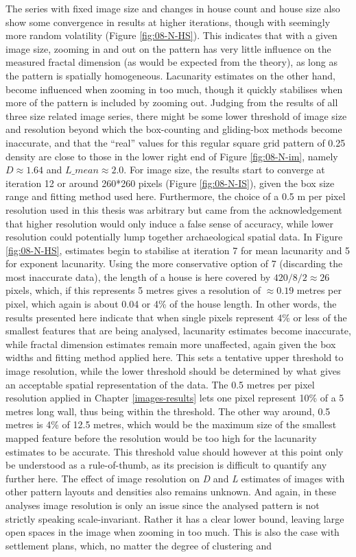 \documentclass[
  12pt,
]{book}
\begin{document}
The series with fixed image size and changes in house count and house size also show some convergence in results at higher iterations, though with seemingly more random volatility (Figure \ref{fig:08-N-HS}). This indicates that with a given image size, zooming in and out on the pattern has very little influence on the measured fractal dimension (as would be expected from the theory), as long as the pattern is spatially homogeneous. Lacunarity estimates on the other hand, become influenced when zooming in too much, though it quickly stabilises when more of the pattern is included by zooming out. Judging from the results of all three size related image series, there might be some lower threshold of image size and resolution beyond which the box-counting and gliding-box methods become inaccurate, and that the ``real'' values for this regular square grid pattern of 0.25 density are close to those in the lower right end of Figure \ref{fig:08-N-im}, namely \(D \approx 1.64\) and \(L\_mean\approx 2.0\). For image size, the results start to converge at iteration 12 or around 260*260 pixels (Figure \ref{fig:08-N-IS}), given the box size range and fitting method used here. Furthermore, the choice of a 0.5 m per pixel resolution used in this thesis was arbitrary but came from the acknowledgement that higher resolution would only induce a false sense of accuracy, while lower resolution could potentially lump together archaeological spatial data. In Figure \ref{fig:08-N-HS}, estimates begin to stabilise at iteration 7 for mean lacunarity and 5 for exponent lacunarity. Using the more conservative option of 7 (discarding the most inaccurate data), the length of a house is here covered by \(420/8/2 \approx 26\) pixels, which, if this represents 5 metres gives a resolution of \(\approx 0.19\) metres per pixel, which again is about 0.04 or 4\% of the house length. In other words, the results presented here indicate that when single pixels represent 4\% or less of the smallest features that are being analysed, lacunarity estimates become inaccurate, while fractal dimension estimates remain more unaffected, again given the box widths and fitting method applied here. This sets a tentative upper threshold to image resolution, while the lower threshold should be determined by what gives an acceptable spatial representation of the data. The 0.5 metres per pixel resolution applied in Chapter \ref{images-results} lets one pixel represent 10\% of a 5 metres long wall, thus being within the threshold. The other way around, 0.5 metres is 4\% of 12.5 metres, which would be the maximum size of the smallest mapped feature before the resolution would be too high for the lacunarity estimates to be accurate. This threshold value should however at this point only be understood as a rule-of-thumb, as its precision is difficult to quantify any further here. The effect of image resolution on \emph{D} and \emph{L} estimates of images with other pattern layouts and densities also remains unknown. And again, in these analyses image resolution is only an issue since the analysed pattern is not strictly speaking scale-invariant. Rather it has a clear lower bound, leaving large open spaces in the image when zooming in too much. This is also the case with settlement plans, which, no matter the degree of clustering and 
\end{document}
